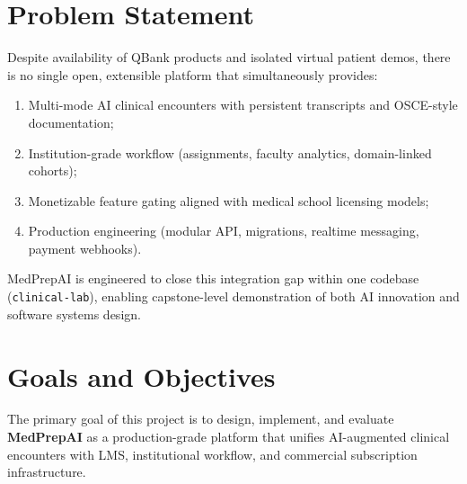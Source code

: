 \section{Problem Statement}
Despite availability of QBank products and isolated virtual patient demos, there is no single open, extensible platform that simultaneously provides:
\begin{enumerate}
  \item Multi-mode AI clinical encounters with persistent transcripts and OSCE-style documentation;
  \item Institution-grade workflow (assignments, faculty analytics, domain-linked cohorts);
  \item Monetizable feature gating aligned with medical school licensing models;
  \item Production engineering (modular API, migrations, realtime messaging, payment webhooks).
\end{enumerate}
MedPrepAI is engineered to close this integration gap within one codebase (\texttt{clinical-lab}), enabling capstone-level demonstration of both AI innovation and software systems design.

\section{Goals and Objectives}
The primary goal of this project is to design, implement, and evaluate \textbf{MedPrepAI} as a production-grade platform that unifies AI-augmented clinical encounters with LMS, institutional workflow, and commercial subscription infrastructure.


